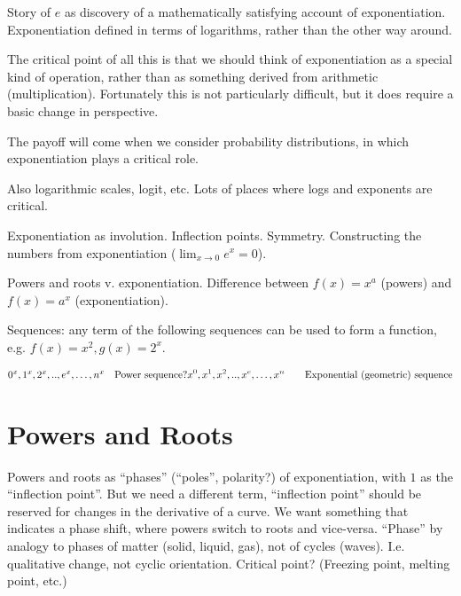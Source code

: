 \begin{remark}
  Story of $e$ as discovery of a mathematically satisfying account of
  exponentiation.  Exponentiation defined in terms of logarithms,
  rather than the other way around.
\end{remark}

The critical point of all this is that we should think of
exponentiation as a special kind of operation, rather than as
something derived from arithmetic (multiplication).  Fortunately this
is not particularly difficult, but it does require a basic change in
perspective.

The payoff will come when we consider probability distributions, in
which exponentiation plays a critical role.

\begin{remark}
  Also logarithmic scales, logit, etc.  Lots of places where logs and
  exponents are critical.
\end{remark}

\begin{remark}
  Exponentiation as involution.  Inflection points.  Symmetry.
  Constructing the numbers from exponentiation ($\lim_{x \to 0}e^x =
  0$).
\end{remark}

\begin{remark}
  Powers and roots v. exponentiation.  Difference between ${f(x) =
    x^a}$ (powers) and ${f(x)= a^x}$ (exponentiation).
\end{remark}

Sequences: any term of the following sequences can be used to form a
function, e.g. $f(x) = x^2, g(x) = 2^x$.

{
  \begin{alignat}{2}
    0^x, 1^x, 2^x,..,e^x,\ldots,n^x & \quad \textnormal{Power sequence?}
    x^0, x^1, x^2,..,x^e,\ldots,x^n & \quad \textnormal{Exponential (geometric) sequence} \\
  \end{alignat}
}

\section{Powers and Roots}

\begin{remark}
  Powers and roots as ``phases'' (``poles'', polarity?) of
  exponentiation, with $1$ as the ``inflection point''.  But we need a
  different term, ``inflection point'' should be reserved for changes
  in the derivative of a curve.  We want something that indicates a
  phase shift, where powers switch to roots and vice-versa.  ``Phase''
  by analogy to phases of matter (solid, liquid, gas), not of cycles
  (waves).  I.e. qualitative change, not cyclic orientation.  Critical
  point? (Freezing point, melting point, etc.)
\end{remark}

